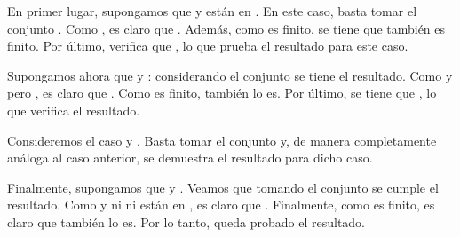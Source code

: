 \begin{isabellebody}
\begin{isamarkuptext}
\begin{demostracion}
  En primer lugar, supongamos que  y  están en . En este caso, basta tomar el conjunto
  . Como , es claro que . Además, como  es finito, se
  tiene que  también es finito. Por último, verifica que , lo que prueba el
  resultado para este caso.

  Supongamos ahora que  y : considerando el conjunto  se tiene el
  resultado. Como  y  pero , es claro que . Como  es
  finito,  también lo es. Por último, se tiene que , lo que verifica el resultado.

  Consideremos el caso  y . Basta tomar el conjunto  y, de manera 
  completamente análoga al caso anterior, se demuestra el resultado para dicho caso.

  Finalmente, supongamos que  y . Veamos que tomando el conjunto  se cumple
  el resultado. Como  y ni  ni  están en , es claro que .
  Finalmente, como  es finito, es claro que  también lo es. Por lo tanto, queda probado el
  resultado.
\end{demostracion}


\end{isamarkuptext}
\end{isabellebody}
